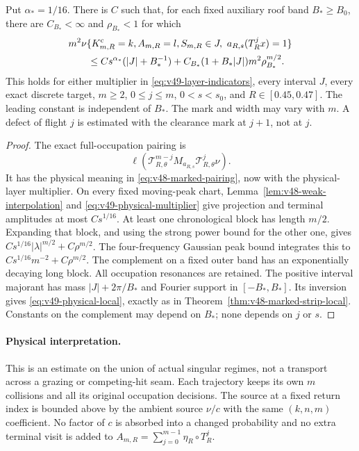 \begin{theorem}
\label{thm:v49-physical-marked-local}
Put $\alpha_*=1/16$. There is $C$ such that, for each fixed auxiliary
roof band $B_*\ge B_0$, there are $C_{B_*}<\infty$ and
$\rho_{B_*}<1$ for which
\begin{align}
 &m^2\nu\{K^{\rm c}_{m,R}=k,A_{m,R}=l,
       S_{m,R}\in J,\ a_{R,s}(T_R^j x)=1\}\notag\\
 &\qquad\le Cs^{\alpha_*}(|J|+B_*^{-1})
       +C_{B_*}(1+B_*|J|)m^2\rho_{B_*}^{m/2}.
                                      \label{eq:v49-physical-local}
\end{align}
This holds for either multiplier in
\eqref{eq:v49-layer-indicators}, every interval $J$, every exact
discrete target, $m\ge2$, $0\le j\le m$, $0<s<s_0$, and $R\in[0.45,0.47]$.
The leading constant is independent of $B_*$. The mark and width may
vary with $m$. A defect of flight $j$ is estimated with the clearance
mark at $j+1$, not at $j$.
\end{theorem}
\begin{proof}
The exact full-occupation pairing is
\[
 \ell(\mathscr T_{R,\theta}^{m-j}M_{a_{R,s}}
                    \mathscr T_{R,\theta}^{j}\nu).
\]
It has the physical meaning in
\eqref{eq:v48-marked-pairing}, now with the physical-layer multiplier.
On every fixed moving-peak chart,
Lemma~\ref{lem:v48-weak-interpolation} and
\eqref{eq:v49-physical-multiplier} give projection and terminal
amplitudes at most $Cs^{1/16}$. At least one chronological block has
length $m/2$. Expanding that block, and using the strong power bound
for the other one, gives
$Cs^{1/16}|\lambda|^{m/2}+C\rho^{m/2}$.
The four-frequency Gaussian peak bound integrates this to
$Cs^{1/16}m^{-2}+C\rho^{m/2}$.
The complement on a fixed outer band has an exponentially decaying
long block. All occupation resonances are retained. The positive
interval majorant has mass $|J|+2\pi/B_*$ and Fourier support in
$[-B_*,B_*]$. Its inversion gives
\eqref{eq:v49-physical-local}, exactly as in
Theorem~\ref{thm:v48-marked-strip-local}. Constants on the complement
may depend on $B_*$; none depends on $j$ or $s$.
\end{proof}

\paragraph{Physical interpretation.}
This is an estimate on the union of actual singular regimes, not a
transport across a grazing or competing-hit seam. Each trajectory
keeps its own $m$ collisions and all its original occupation decisions.
The source at a fixed return index is bounded above by the ambient
source $\nu/c$ with the same $(k,n,m)$ coefficient. No factor of $c$
is absorbed into a changed probability and no extra terminal visit is
added to $A_{m,R}=\sum_{j=0}^{m-1}\eta_R\circ T_R^j$.
